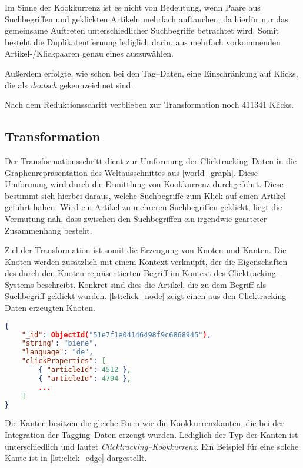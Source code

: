 Im Sinne der Kookkurrenz ist es nicht von Bedeutung, wenn Paare aus Suchbegriffen und geklickten Artikeln mehrfach auftauchen, da hierfür nur das gemeinsame Auftreten unterschiedlicher Suchbegriffe betrachtet wird. Somit besteht die Duplikatentfernung lediglich darin, aus mehrfach vorkommenden Artikel-/Klickpaaren genau eines auszuwählen.

Außerdem erfolgte, wie schon bei den Tag--Daten, eine Einschränkung auf Klicks, die als \emph{deutsch} gekennzeichnet sind.

Nach dem Reduktionsschritt verblieben zur Transformation noch \num{411341} Klicks.

\subsection{Transformation}

Der Transformationsschritt dient zur Umformung der Clicktracking--Daten in die Graphenrepräsentation des Weltausschnittes aus \cref{world_graph}. Diese Umformung wird durch die Ermittlung von Kookkurrenz durchgeführt. Diese bestimmt sich hierbei daraus, welche Suchbegriffe zum Klick auf einen Artikel geführt haben. Wird ein Artikel zu mehreren Suchbegriffen geklickt, liegt die Vermutung nah, dass zwischen den Suchbegriffen ein irgendwie gearteter Zusammenhang besteht.

Ziel der Transformation ist somit die Erzeugung von Knoten und Kanten. Die Knoten werden zusätzlich mit einem Kontext verknüpft, der die Eigenschaften des durch den Knoten repräsentierten Begriff im Kontext des Clicktracking--Systems beschreibt. Konkret sind dies die Artikel, die zu dem Begriff als Suchbegriff geklickt wurden. \cref{lst:click_node} zeigt einen aus den Clicktracking--Daten erzeugten Knoten.

\begin{lstlisting}[language=json, label={lst:click_node}, caption={JSON--Beispiel für ein aus den Clicktracking--Daten erzeugtes Knotenobjekt}, float]
{
    "_id": ObjectId("51e7f1e04146498f9c6868945"),
    "string": "biene",
    "language": "de",
    "clickProperties": [
        { "articleId": 4512 },
        { "articleId": 4794 },
        ...
    ]
}
\end{lstlisting}

Die Kanten besitzen die gleiche Form wie die Kookkurrenzkanten, die bei der Integration der Tagging--Daten erzeugt wurden. Lediglich der Typ der Kanten ist unterschiedlich und lautet \emph{Clicktracking--Kookkurrenz}. Ein Beispiel für eine solche Kante ist in \cref{lst:click_edge} dargestellt.

